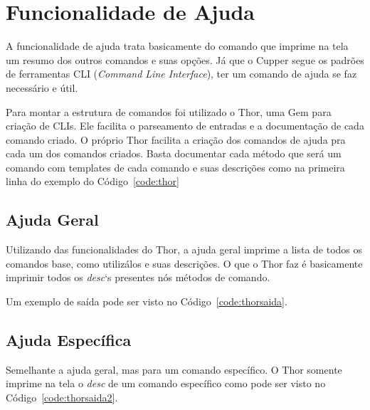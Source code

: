 \section{Funcionalidade de Ajuda}
\label{sec:help}

A funcionalidade de ajuda trata basicamente do comando que imprime na tela um resumo
dos outros comandos e suas opções. Já que o Cupper segue os padrões de ferramentas
CLI (\textit{Command Line Interface}), ter um comando de ajuda se faz necessário
e útil.

Para montar a estrutura de comandos foi utilizado o Thor, uma Gem para criação
de CLIs. Ele facilita o parseamento de entradas e a documentação de cada comando criado.
O próprio Thor facilita a criação dos comandos de ajuda pra cada um dos comandos
criados. Basta documentar cada método que será um comando com templates de cada
comando e suas descrições como na primeira linha do exemplo do Código~\ref{code:thor}

\noindent\begin{minipage}{\textwidth}
  \lstset{style=shell}
  
\end{minipage}\hfill

\subsection{Ajuda Geral}
Utilizando das funcionalidades do Thor, a ajuda geral imprime a lista de todos
os comandos base, como utilizálos e suas descrições. O que o Thor faz é basicamente
imprimir todos os \textit{desc}`s presentes nós métodos de comando.

Um exemplo de saída pode ser visto no Código~\ref{code:thorsaida}.

\noindent\begin{minipage}{\textwidth}
  \lstset{style=shell}
  
\end{minipage}\hfill


\subsection{Ajuda Específica}
Semelhante a ajuda geral, mas para um comando específico. O Thor somente imprime
na tela o \textit{desc} de um comando específico como pode ser visto no Código~\ref{code:thorsaida2}.

\noindent\begin{minipage}{\textwidth}
  \lstset{style=shell}
  
\end{minipage}\hfill
